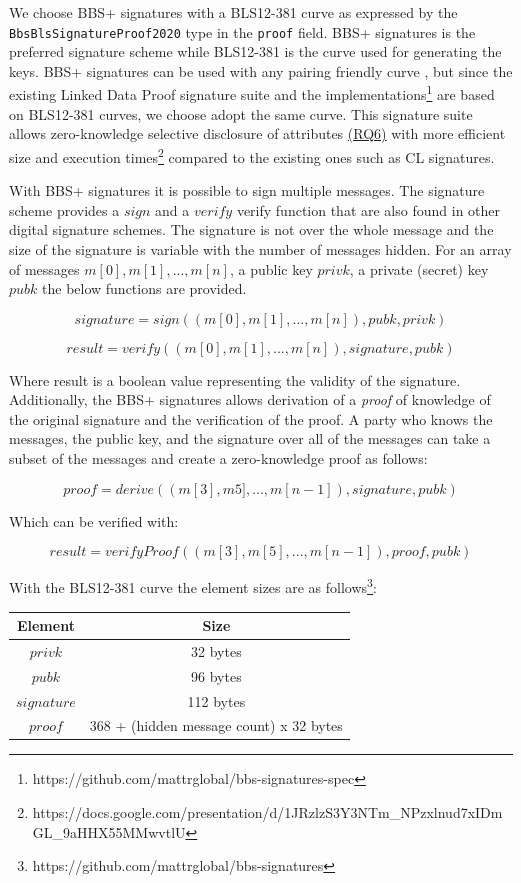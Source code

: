 We choose BBS+ signatures with a BLS12-381 curve as expressed by the \lstinline{BbsBlsSignatureProof2020} type in the \lstinline{proof} field. BBS+ signatures is the preferred signature scheme while BLS12-381 is the curve used for generating the keys. BBS+ signatures can be used with any pairing friendly curve \parencite{irtf-cfrg-pairing-friendly-curves-09}, but since the existing Linked Data Proof signature suite \parencite{looker_steele_2021} and the implementations\footnote{https://github.com/mattrglobal/bbs-signatures-spec} are based on BLS12-381 curves, we choose adopt the same curve. This signature suite allows zero-knowledge selective disclosure of attributes \hyperref[rq:selective-disclosure]{(RQ6)} with more efficient size and execution times\footnote{https://docs.google.com/presentation/d/1JRzlzS3Y3NTm_NPzxlnud7xIDmGL_9aHHX55MMwvtlU} compared to the existing ones such as \acrshort{CL} signatures. 

With BBS+ signatures it is possible to sign multiple messages. The signature scheme provides a $sign$ and a $verify$ verify function that are also found in other digital signature schemes. The signature is not over the whole message and the size of the signature is variable with the number of messages hidden. For an array of messages $m[0], m[1], ..., m[n]$, a public key $privk$, a private (secret) key $pubk$ the below functions are provided.

\[signature = sign((m[0], m[1], ..., m[n]), pubk, privk)\]

\[result = verify((m[0], m[1], ..., m[n]), signature, pubk)\]

Where result is a boolean value representing the validity of the signature. Additionally, the BBS+ signatures allows derivation of a \textit{proof} of knowledge of the original signature and the verification of the proof. A party who knows the messages, the public key, and the signature over all of the messages can take a subset of the messages and create a zero-knowledge proof as follows:

\[proof = derive( (m[3], m5],..., m[n-1]), signature, pubk)\]

Which can be verified with: 

\[result = verifyProof( (m[3], m[5],..., m[n-1]), proof, pubk) \]

With the BLS12-381 curve the element sizes are as follows\footnote{https://github.com/mattrglobal/bbs-signatures}:
\begin{center}
\begin{tabular}{ c c }
  Element & Size    \\
  \hline
  $privk$   &   32 bytes    \\
  $pubk$    &   96 bytes    \\
  $signature$ & 112 bytes   \\
  $proof$   &   368 + (hidden message count) x 32 bytes
\end{tabular}
\end{center}

